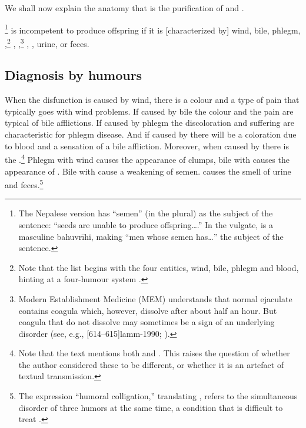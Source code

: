\begin{translation}
    
    \item [1] We shall now explain the anatomy that is the purification of 
     and 
    .
%    
    
    \item [3]  \footnote{The Nepalese version has
     “semen” (in the plural) as the subject of the
    sentence: “seeds are unable to produce offspring\ldots.”  In the
    vulgate,  is a masculine bahuvrīhi, making “men
    whose semen has\ldots” the subject of the sentence.} is
    incompetent to produce offspring if it is [characterized by] wind,
    bile, phlegm, ,\footnote{Note that the list
        begins with the four entities, wind, bile, phlegm and blood,
        hinting at a four-humour system \citep[see][485--486]{wuja-2000}.}
        ,
        ,\footnote{\label{granthi}Modern
            Establishment Medicine (MEM) understands that normal ejaculate
            contains coagula which, however, dissolve after about half an
            hour.  But coagula that do not dissolve may sometimes be a sign of
            an underlying disorder (see, e.g., 
            [614--615]{lamm-1990}; \cite{cohe-1990}).}
            , ,
            urine, or feces.
    
 \subsection{Diagnosis by humours}

 \item[4]
 
  When the disfunction is caused by wind, there is a colour and a type of
pain
  that typically goes with wind problems. If  caused by bile the colour and the 
  pain are typical of bile afflictions.  If caused by phlegm the discoloration and 
  suffering are characteristic for phlegm disease.  And if caused by  
   there will be a coloration due to blood and a 
  sensation of a bile affliction. Moreover, when caused by 
   there is the .\footnote{Note that the text mentions both  and 
  .  This raises the question of whether the author considered these 
  to be different, or whether it is an artefact of textual transmission.}  Phlegm 
  with wind causes the appearance of clumps,
  bile with   causes the appearance of 
  . 
   Bile with  cause a weakening of semen.
       causes the smell of urine and 
      feces.\footnote{The expression “humoral colligation,” translating 
      , refers to the simultaneous 
      disorder of three humors at the same time, a condition that is difficult to 
      treat \citep[see][38 \emph{et 
      passim}]{wuja-2016}.}
      

\end{translation}
